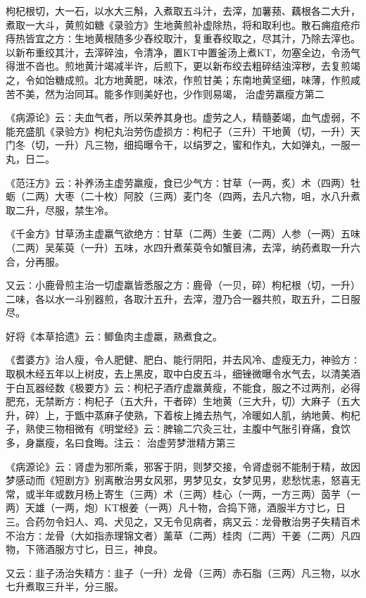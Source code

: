\documentclass[a4paper,12pt,UTF8,twoside]{ctexbook}
\begin{document}
枸杞根切，大一石，以水大三斛，入煮取五斗汁，去滓，加薯蓣、藕根各二大升，煮取一大斗，黄煎如糖《录验方》生地黄煎补虚除热，将和取利也。散石痈疽疮疖痔热皆宜之方∶生地黄根随多少舂绞取汁，复重舂绞取之，尽其汁，乃除去滓也。以新布重绞其汁，去滓碎浊，令清净，置KT中置釜汤上煮KT，勿塞全边，令汤气得泄不沓也。煎地黄汁竭减半许，后煎下，更以新布绞去粗碎结浊滓秽，去复煎竭之，令如饴糖成煎。北方地黄肥，味浓，作煎甘美；东南地黄坚细，味薄，作煎咸苦不美，然为治同耳。能多作则美好也，少作则易竭，
治虚劳羸瘦方第二

《病源论》云∶夫血气者，所以荣养其身也。虚劳之人，精髓萎竭，血气虚弱，不能充盛肌《录验方》枸杞丸治劳伤虚损方∶枸杞子（三升）干地黄（切，一升）天门冬（切，一升）凡三物，细捣曝令干，以绢罗之，蜜和作丸，大如弹丸，一服一丸，日二。

《范汪方》云∶补养汤主虚劳羸瘦，食已少气方∶甘草（一两，炙）术（四两）牡蛎（二两）大枣（二十枚）阿胶（三两）麦门冬（四两，去凡六物，咀，水八升煮取二升，尽服，禁生冷。

《千金方》甘草汤主虚羸气欲绝方∶甘草（二两）生姜（二两）人参（一两）五味（二两）吴茱萸（一升）五味，水四升煮茱萸令如蟹目沸，去滓，纳药煮取一升六合，分再服。

又云∶小鹿骨煎主治一切虚羸皆悉服之方∶鹿骨（一贝，碎）枸杞根（切，一升）二味，各以水一斗别器煎，各取汁五升，去滓，澄乃合一器共煎，取五升，二日服尽。

好将《本草拾遗》云∶鲫鱼肉主虚羸，熟煮食之。

《耆婆方》治人瘦，令人肥健、肥白、能行阴阳，并去风冷、虚瘦无力，神验方∶取枫木经五年以上树皮，去上黑皮，取中白皮五斗，细锉微曝令水气去，以清美酒于白瓦器经数《极要方》云∶枸杞子酒疗虚羸黄瘦，不能食，服之不过两剂，必得肥充，无禁断方∶枸杞子（五大升，干者碎）生地黄（三大升，切）大麻子（五大升，碎）上，于甑中蒸麻子使熟，下着桉上摊去热气，冷暖如人肌，纳地黄、枸杞子，熟使三物相微有《明堂经》云∶脾输二穴灸三壮，主腹中气胀引脊痛，食饮多，身羸瘦，名曰食晦。注云∶
治虚劳梦泄精方第三

《病源论》云∶肾虚为邪所乘，邪客于阴，则梦交接，令肾虚弱不能制于精，故因梦感动而《短剧方》别离散治男女风邪，男梦见女，女梦见男，悲愁忧恚，怒喜无常，或半年或数月杨上寄生（三两）术（三两）桂心（一两，一方三两）茵芋（一两）天雄（一两，炮）KT根姜（一两）凡十物，合捣下筛，酒服半方寸匕，日三。合药勿令妇人、鸡、犬见之，又无令见病者，病又云∶龙骨散治男子失精百术不治方∶龙骨（大如指赤理锦文者）薰草（二两）桂肉（二两）干姜（二两）凡四物，下筛酒服方寸匕，日三，神良。

又云∶韭子汤治失精方∶韭子（一升）龙骨（三两）赤石脂（三两）凡三物，以水七升煮取三升半，分三服。
\end{document}
